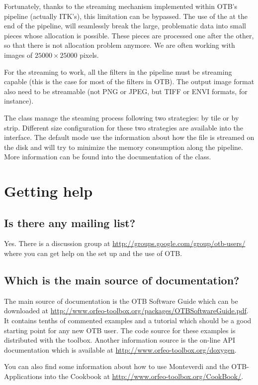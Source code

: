 Fortunately, thanks to the streaming mechanism implemented within OTB's pipeline (actually ITK's), this limitation can be bypassed. The use of the  at the end of the pipeline, will seamlessly break the large, problematic data into small pieces whose allocation is possible. These pieces are processed one after the other, so that there is not allocation problem anymore. We are often working with images of $25000 \times 25000$ pixels.

For the streaming to work, all the filters in the pipeline must be streaming
capable (this is the case for most of the filters in OTB). The output image
format also need to be streamable (not PNG or JPEG, but TIFF or ENVI formats, for instance).

The class  manage the steaming process following two strategies: by tile or by strip. Different size configuration for these two strategies are available into the interface. The default mode use the information about how the file is streamed on the disk and will try to minimize the memory consumption along the pipeline. More information can be found into the documentation of the class.


\section{Getting help}
\subsection{Is there any mailing list?}
Yes. There is a discussion group at
\url{http://groups.google.com/group/otb-users/} where you can get help
on the set up and the use of OTB.

\subsection{Which is the main source of documentation?}
The main source of documentation is the OTB Software Guide which can
be downloaded at
\url{http://www.orfeo-toolbox.org/packages/OTBSoftwareGuide.pdf}. It
contains tenths of commented examples and a tutorial which should be a good starting
point for any new OTB user. The code source for these examples is
distributed with the toolbox. Another information source is the
on-line API documentation which is available at \url{http://www.orfeo-toolbox.org/doxygen}.

You can also find some information about how to use Monteverdi and the OTB-Applications into the Cookbook at \url{http://www.orfeo-toolbox.org/CookBook/}.


